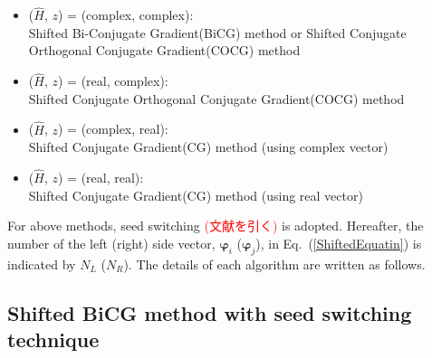 \documentclass[12pt,titlepage]{article}
\begin{document}
\begin{itemize}
\item (${\hat H}$, $z$) = (complex, complex): \\
Shifted Bi-Conjugate Gradient(BiCG) method \cite{BiCG} or Shifted Conjugate Orthogonal Conjugate Gradient(COCG) method \cite{COCG}
\item  (${\hat H}$, $z$) = (real, complex):\\
Shifted Conjugate Orthogonal Conjugate Gradient(COCG) method \cite{COCG}
\item  (${\hat H}$, $z$) = (complex, real):\\
Shifted Conjugate Gradient(CG) method (using complex vector)
\item  (${\hat H}$, $z$) = (real, real):\\
Shifted Conjugate Gradient(CG) method (using real vector)
\end{itemize}
For above methods, seed switching
\textcolor{red}{(文献を引く)}
is adopted.
Hereafter, the number of the left (right) side vector, $ {\boldsymbol \varphi}_{i}$ ($ {\boldsymbol \varphi}_{j}$), in Eq.~(\ref{ShiftedEquatin}) is indicated by $N_L$ ($N_R$). The details of each algorithm are written as follows.
\subsection{Shifted BiCG method with seed switching technique}
\end{document}
